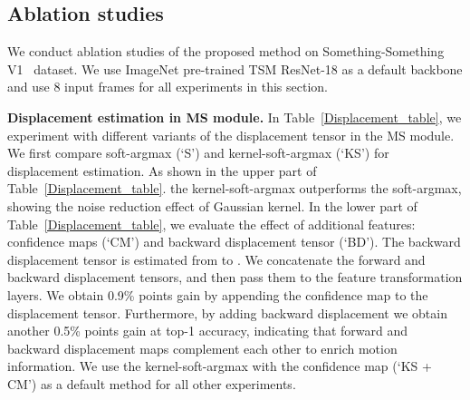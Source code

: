 \documentclass[runningheads]{llncs}
\begin{document}
\subsection{Ablation studies} \label{ablation}
We conduct ablation studies of the proposed method on Something-Something V1~\cite{goyal2017something} dataset.
We use ImageNet pre-trained TSM ResNet-18 as a default backbone and use 8 input frames for all experiments in this section.

\smallbreak
\noindent
\textbf{Displacement estimation in MS module.}  
In Table~\ref{Displacement_table}, we experiment with different variants of the displacement tensor  in the MS module. 
We first compare soft-argmax (`S') and kernel-soft-argmax (`KS') for displacement estimation. As shown in the upper part of Table~\ref{Displacement_table}.
the kernel-soft-argmax outperforms the soft-argmax, showing the noise reduction effect of Gaussian kernel.
In the lower part of Table~\ref{Displacement_table}, we evaluate the effect of additional features: confidence maps (`CM') and backward displacement tensor (`BD').
The backward displacement tensor is estimated from  to .
We concatenate the forward and backward displacement tensors, and then pass them to the feature transformation layers.
We obtain 0.9\% points gain by appending the confidence map to the displacement tensor.
Furthermore, by adding backward displacement we obtain another 0.5\% points gain at top-1 accuracy, indicating that forward and backward displacement maps complement each other to enrich motion information.
We use the kernel-soft-argmax with the confidence map (`KS + CM') as a default method for all other experiments.
\end{document}
